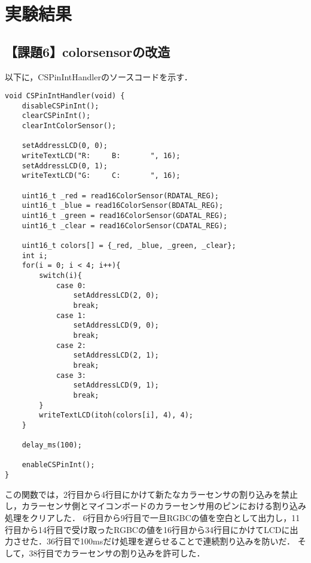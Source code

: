 \documentclass{jlreq}
\begin{document}
\section{実験結果}

\subsection{【課題6】colorsensorの改造}
以下に，CSPinIntHandlerのソースコードを示す．

\begin{lstlisting}[label=a6CS,caption={【課題6】colorsensorにおけるCSPinIntHandler関数}]
void CSPinIntHandler(void) {
    disableCSPinInt();
    clearCSPinInt();
    clearIntColorSensor();

    setAddressLCD(0, 0);
    writeTextLCD("R:     B:       ", 16);
    setAddressLCD(0, 1);
    writeTextLCD("G:     C:       ", 16);

    uint16_t _red = read16ColorSensor(RDATAL_REG);
    uint16_t _blue = read16ColorSensor(BDATAL_REG);
    uint16_t _green = read16ColorSensor(GDATAL_REG);
    uint16_t _clear = read16ColorSensor(CDATAL_REG);

    uint16_t colors[] = {_red, _blue, _green, _clear};
    int i;
    for(i = 0; i < 4; i++){
        switch(i){
            case 0:
                setAddressLCD(2, 0);
                break;
            case 1:
                setAddressLCD(9, 0);
                break;
            case 2:
                setAddressLCD(2, 1);
                break;
            case 3:
                setAddressLCD(9, 1);
                break;
        }
        writeTextLCD(itoh(colors[i], 4), 4);
    }

    delay_ms(100);

    enableCSPinInt();
}
\end{lstlisting}
この関数では，2行目から4行目にかけて新たなカラーセンサの割り込みを禁止し，カラーセンサ側とマイコンボードのカラーセンサ用のピンにおける割り込み処理をクリアした．
6行目から9行目で一旦RGBCの値を空白として出力し，11行目から14行目で受け取ったRGBCの値を16行目から34行目にかけてLCDに出力させた．36行目で100msだけ処理を遅らせることで連続割り込みを防いだ．
そして，38行目でカラーセンサの割り込みを許可した．
\end{document}
